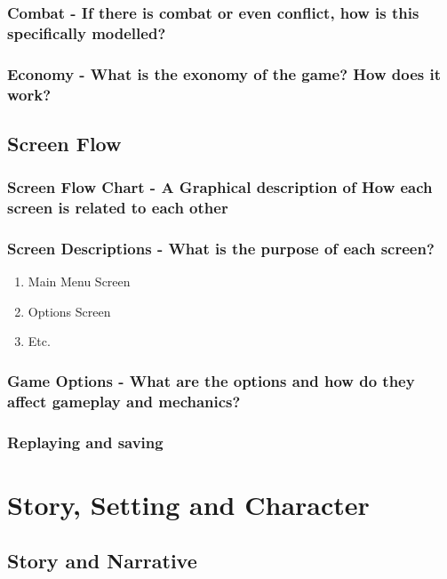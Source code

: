 \documentclass[article, 11pt]{article}
\begin{document}
\subsubsection{Combat - If there is combat or even conflict, how is this specifically modelled?}
\label{sec:orgec8a7cf}
\subsubsection{Economy - What is the exonomy of the game? How does it work?}
\label{sec:org144a7b0}
\subsection{Screen Flow}
\label{sec:org76e3a4c}
\subsubsection{Screen Flow Chart - A Graphical description of How each screen is related to each other}
\label{sec:orga5271fc}
\subsubsection{Screen Descriptions - What is the purpose of each screen?}
\label{sec:orgcb7af26}
\begin{enumerate}
\item Main Menu Screen
\label{sec:orgbb2c741}
\item Options Screen
\label{sec:orgb0c6004}
\item Etc.
\label{sec:org7bf9e07}
\end{enumerate}
\subsubsection{Game Options - What are the options and how do they affect gameplay and mechanics?}
\label{sec:orgaa0109a}
\subsubsection{Replaying and saving}
\label{sec:org9cce058}

\section{Story, Setting and Character}
\label{sec:orgd94209c}
\subsection{Story and Narrative}
\label{sec:org0c361a4}
\end{document}
